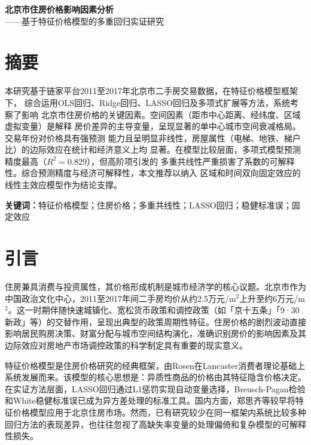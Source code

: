 \documentclass[12pt,a4paper]{ctexart}
\begin{document}
\begin{center}
{\sffamily\bfseries{} 北京市住房价格影响因素分析}\\[0.6cm]
{\sffamily{} ——基于特征价格模型的多重回归实证研究}
\end{center}

\section*{摘\quad 要}

本研究基于链家平台2011至2017年北京市二手房交易数据，在特征价格模型框架下，
综合运用OLS回归、Ridge回归、LASSO回归及多项式扩展等方法，系统考察了影响
北京市住房价格的关键因素。空间因素（距市中心距离、经纬度、区域虚拟变量）是解释
房价差异的主导变量，呈现显著的单中心城市空间衰减格局。交易年份对价格具有强预测
能力且呈明显非线性，房屋属性（电梯、地铁、梯户比）的边际效应在统计和经济意义上均
显著。在模型比较层面，多项式模型预测精度最高（$R^{2}=0.829$），但高阶项引发的
多重共线性严重损害了系数的可解释性。综合预测精度与经济可解释性，本文推荐以纳入
区域和时间双向固定效应的线性主效应模型作为结论支撑。

\noindent\textbf{关键词：}特征价格模型；住房价格；多重共线性；LASSO回归；稳健标准误；固定效应

\section{引言}

住房兼具消费与投资属性，其价格形成机制是城市经济学的核心议题。北京市作为中国政治文化中心，2011至2017年间二手房均价从约2.5万元/m$^{2}$上升至约6万元/m$^{2}$。这一时期伴随快速城镇化、宽松货币政策和调控政策（如「京十五条」「9·30新政」等）的交替作用，呈现出典型的政策周期性特征。住房价格的剧烈波动直接影响居民购房决策、财富分配与城市空间结构演化，准确识别房价的影响因素及其边际效应对房地产市场调控政策的科学制定具有重要的现实意义。

特征价格模型是住房价格研究的经典框架，由Rosen\cite{rosen1974}在Lancaster\cite{lancaster1966}消费者理论基础上系统发展而来。该模型的核心思想是：异质性商品的价格由其特征隐含价格决定。在实证方法层面，LASSO回归\cite{tibshirani1996}通过L1惩罚实现自动变量选择，Breusch-Pagan检验\cite{breusch1979}和White稳健标准误\cite{white1980}已成为异方差处理的标准工具。国内方面，郑思齐等\cite{zheng2005}较早将特征价格模型应用于北京住房市场。然而，已有研究较少在同一框架内系统比较多种回归方法的表现差异，也往往忽视了高缺失率变量的处理偏倚和复杂模型的可解释性损失。
\end{document}
